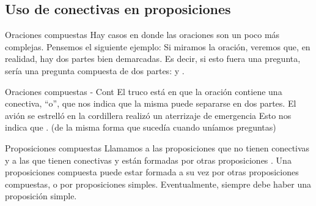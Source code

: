 
\subsection{Uso de conectivas en proposiciones}


\begin{frame}{Oraciones compuestas}
  Hay casos en donde las oraciones son un poco más complejas. Pensemos el
  siguiente ejemplo:
  \jump
  \jump
  Si miramos la oración, veremos que, en realidad, hay dos partes bien
  demarcadas. Es decir, si esto fuera una pregunta, sería una pregunta
  compuesta de dos partes: 
  y .
\end{frame}


\begin{frame}{Oraciones compuestas - Cont}
  El truco está en que la oración contiene una conectiva, ``o'', que nos indica
  que la misma puede separarse en dos partes.
  \jump
  El avión se estrelló en la cordillera  realizó un aterrizaje de emergencia
  \jump
  Esto nos indica que .
  \jump
   (de
  la misma forma que sucedía cuando uníamos preguntas)
  \jump
\end{frame}


\begin{frame}{Proposiciones compuestas}
  Llamamos a las proposiciones que no tienen conectivas
   y a las que tienen conectivas y están
  formadas por otras proposiciones .
  \jump
  Una proposiciones compuesta puede estar formada a su vez por otras
  proposiciones compuestas, o por proposiciones simples.
  \jump
  Eventualmente, siempre debe haber una proposición simple.
\end{frame}

